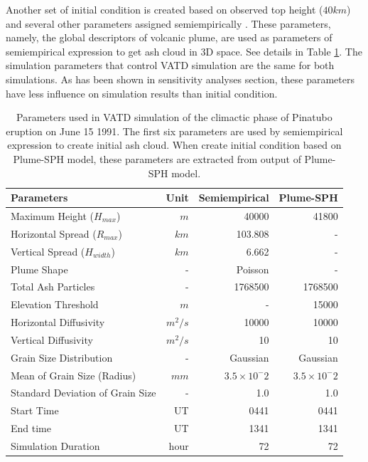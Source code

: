 \documentclass[draft,linenumbers]{agujournal2019}
\begin{document}
Another set of initial condition is created based on observed top height ($40 km$) and several other parameters assigned semiempirically \citep{bursik2012estimation}. These parameters, namely, the global descriptors of volcanic plume, are used as parameters of semiempirical expression to get ash cloud in 3D space. See details in Table \ref{tab:input_parameter_Puff_simulation}. The simulation parameters that control VATD simulation are the same for both simulations. As has been shown in sensitivity analyses section, these parameters have less influence on simulation results than initial condition.
 
\begin{table}[htp]
\centering
      \caption{Parameters used in VATD simulation of the climactic phase of Pinatubo eruption on June 15 1991. The first six parameters are used by semiempirical expression to create initial ash cloud. When create initial condition based on Plume-SPH model, these parameters are extracted from output of Plume-SPH model.}
	  \begin{tabular}{lrrr}
	    \hline
	    Parameters & Unit & Semiempirical & Plume-SPH \\
	    \hline
	    Maximum Height ($H_{max}$) & $m$ & 40000 & 41800 \\
	    Horizontal Spread ($R_{max}$) & $km$ & 103.808 & -\\
	    Vertical Spread ($H_{width}$) & $km$ & 6.662  & - \\
	    Plume Shape & - & Poisson & - \\
	    Total Ash Particles  & - & 1768500 & 1768500 \\
	    Elevation Threshold & $m$ & - &  15000 \\
	    Horizontal Diffusivity & $m^2/s$ &10000 & 10000\\
	    Vertical Diffusivity & $m^2/s$ & 10 & 10 \\
	    Grain Size Distribution & - & Gaussian & Gaussian  \\
	    Mean of Grain Size (Radius) & $mm$ & $3.5 \times 10 ^-2$ & $3.5 \times 10 ^-2$ \\
	    Standard Deviation of Grain Size & - &  1.0 & 1.0 \\
	    	Start Time & UT & 0441 & 0441 \\
	    End time & UT & 1341 & 1341 \\
	    Simulation Duration & hour & 72 & 72 \\
	    \hline
	  \end{tabular}
	  \label{tab:input_parameter_Puff_simulation}
\end{table}
\end{document}
